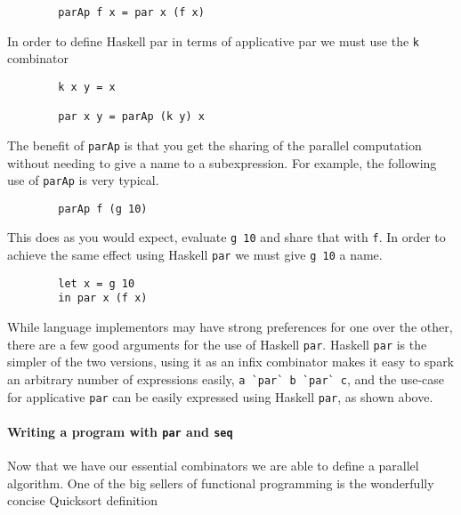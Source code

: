 \begin{verbatim}
        parAp f x = par x (f x)
\end{verbatim}

In order to define Haskell par in terms of applicative par we must use the
\verb=k= combinator

\begin{verbatim}
        k x y = x

        par x y = parAp (k y) x
\end{verbatim}

The benefit of \verb|parAp| is that you get the sharing of the parallel computation
without needing to give a name to a subexpression. For example, the following use of
\verb|parAp| is very typical.

\begin{verbatim}
        parAp f (g 10)
\end{verbatim}

This does as you would expect, evaluate \verb|g 10| and share that with
\verb|f|. In order to achieve the same effect using Haskell \verb|par| we must
give \verb|g 10| a name.

\begin{verbatim}
        let x = g 10
        in par x (f x)
\end{verbatim}


While language implementors may have strong preferences for one over the other,
there are a few good arguments for the use of Haskell \verb=par=. Haskell
\verb=par= is the simpler of the two versions, using it as an infix combinator
makes it easy to spark an arbitrary number of expressions easily,
\verb-a `par` b `par` c-, and the use-case for applicative \verb=par= can be easily
expressed using Haskell \verb|par|, as shown above.

\paragraph{Writing a program with \texttt{par} and \texttt{seq}}

Now that we have our essential combinators we are able to define a parallel
algorithm. One of the big sellers of functional programming is the wonderfully
concise Quicksort definition

